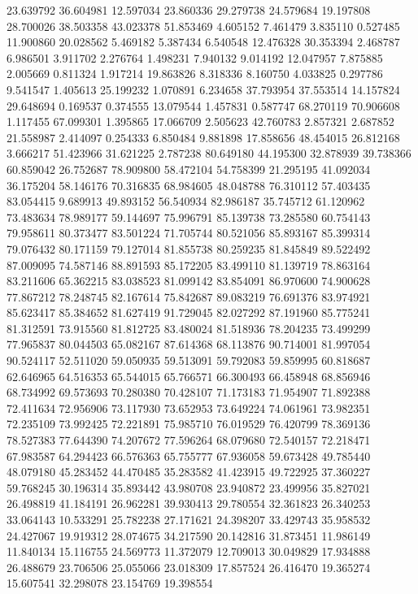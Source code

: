 23.639792
36.604981
12.597034
23.860336
29.279738
24.579684
19.197808
28.700026
38.503358
43.023378
51.853469
4.605152
7.461479
3.835110
0.527485
11.900860
20.028562
5.469182
5.387434
6.540548
12.476328
30.353394
2.468787
6.986501
3.911702
2.276764
1.498231
7.940132
9.014192
12.047957
7.875885
2.005669
0.811324
1.917214
19.863826
8.318336
8.160750
4.033825
0.297786
9.541547
1.405613
25.199232
1.070891
6.234658
37.793954
37.553514
14.157824
29.648694
0.169537
0.374555
13.079544
1.457831
0.587747
68.270119
70.906608
1.117455
67.099301
1.395865
17.066709
2.505623
42.760783
2.857321
2.687852
21.558987
2.414097
0.254333
6.850484
9.881898
17.858656
48.454015
26.812168
3.666217
51.423966
31.621225
2.787238
80.649180
44.195300
32.878939
39.738366
60.859042
26.752687
78.909800
58.472104
54.758399
21.295195
41.092034
36.175204
58.146176
70.316835
68.984605
48.048788
76.310112
57.403435
83.054415
9.689913
49.893152
56.540934
82.986187
35.745712
61.120962
73.483634
78.989177
59.144697
75.996791
85.139738
73.285580
60.754143
79.958611
80.373477
83.501224
71.705744
80.521056
85.893167
85.399314
79.076432
80.171159
79.127014
81.855738
80.259235
81.845849
89.522492
87.009095
74.587146
88.891593
85.172205
83.499110
81.139719
78.863164
83.211606
65.362215
83.038523
81.099142
83.854091
86.970600
74.900628
77.867212
78.248745
82.167614
75.842687
89.083219
76.691376
83.974921
85.623417
85.384652
81.627419
91.729045
82.027292
87.191960
85.775241
81.312591
73.915560
81.812725
83.480024
81.518936
78.204235
73.499299
77.965837
80.044503
65.082167
87.614368
68.113876
90.714001
81.997054
90.524117
52.511020
59.050935
59.513091
59.792083
59.859995
60.818687
62.646965
64.516353
65.544015
65.766571
66.300493
66.458948
68.856946
68.734992
69.573693
70.280380
70.428107
71.173183
71.954907
71.892388
72.411634
72.956906
73.117930
73.652953
73.649224
74.061961
73.982351
72.235109
73.992425
72.221891
75.985710
76.019529
76.420799
78.369136
78.527383
77.644390
74.207672
77.596264
68.079680
72.540157
72.218471
67.983587
64.294423
66.576363
65.755777
67.936058
59.673428
49.785440
48.079180
45.283452
44.470485
35.283582
41.423915
49.722925
37.360227
59.768245
30.196314
35.893442
43.980708
23.940872
23.499956
35.827021
26.498819
41.184191
26.962281
39.930413
29.780554
32.361823
26.340253
33.064143
10.533291
25.782238
27.171621
24.398207
33.429743
35.958532
24.427067
19.919312
28.074675
34.217590
20.142816
31.873451
11.986149
11.840134
15.116755
24.569773
11.372079
12.709013
30.049829
17.934888
26.488679
23.706506
25.055066
23.018309
17.857524
26.416470
19.365274
15.607541
32.298078
23.154769
19.398554
